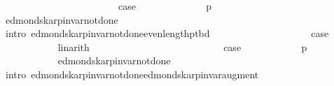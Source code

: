 \begin{isabellebody}
\isanewline
\ \ \ \ \ \ \ \ \ \ \isamarkupfalse%
\ {}\isanewline
\ \ \ \ \ \ \ \ \ \ \isamarkupfalse%
\ {\isacharquery}{\kern0pt}case\isanewline
\ \ \ \ \ \ \ \ \ \ \ \ \isamarkupfalse%
\ p\isanewline
\ \ \ \ \ \ \ \ \ \ \ \ \isamarkupfalse%
\ edmonds{\isacharunderscore}{\kern0pt}karp{\isacharunderscore}{\kern0pt}invar{\isacharunderscore}{\kern0pt}not{\isacharunderscore}{\kern0pt}done{\isacharunderscore}{\kern0pt}{}\isanewline
\ \ \ \ \ \ \ \ \ \ \ \ \isamarkupfalse%
\ {\isacharparenleft}{\kern0pt}intro\ edmonds{\isacharunderscore}{\kern0pt}karp{\isacharunderscore}{\kern0pt}invar{\isacharunderscore}{\kern0pt}not{\isacharunderscore}{\kern0pt}done{\isacharunderscore}{\kern0pt}{}{\isachardot}{\kern0pt}even{\isacharunderscore}{\kern0pt}length{\isacharunderscore}{\kern0pt}p{\isacharunderscore}{\kern0pt}tbd{\isacharparenright}{\kern0pt}\isanewline
\ \ \ \ \ \ \ \ \isamarkupfalse%
%
\endisataginvisible
{\isafoldinvisible}%
%
\isadeliminvisible
\isanewline
%
\endisadeliminvisible
%
\isadelimvisible
\ \ \ \ \ \ \ \ %
\endisadelimvisible
%
\isatagvisible
{}\isamarkupfalse%
\ \isamarkupfalse%
\ {\isacharquery}{\kern0pt}case\isanewline
\ \ \ \ \ \ \ \ \ \ \isamarkupfalse%
\ linarith\isanewline
\ \ \ \ \ \ \isamarkupfalse%
\isanewline
\ \ \ \ \ \ \ \ \isamarkupfalse%
\ {}\isanewline
\ \ \ \ \ \ \ \ \isamarkupfalse%
\ {\isacharquery}{\kern0pt}case\isanewline
\ \ \ \ \ \ \ \ \ \ \isamarkupfalse%
\ p\isanewline
\ \ \ \ \ \ \ \ \ \ \isamarkupfalse%
\ edmonds{\isacharunderscore}{\kern0pt}karp{\isacharunderscore}{\kern0pt}invar{\isacharunderscore}{\kern0pt}not{\isacharunderscore}{\kern0pt}done{\isacharunderscore}{\kern0pt}{}\isanewline
\ \ \ \ \ \ \ \ \ \ \isamarkupfalse%
\ {\isacharparenleft}{\kern0pt}intro\ edmonds{\isacharunderscore}{\kern0pt}karp{\isacharunderscore}{\kern0pt}invar{\isacharunderscore}{\kern0pt}not{\isacharunderscore}{\kern0pt}done{\isacharunderscore}{\kern0pt}{}{\isachardot}{\kern0pt}edmonds{\isacharunderscore}{\kern0pt}karp{\isacharunderscore}{\kern0pt}invar{\isacharunderscore}{\kern0pt}augment{\isacharparenright}{\kern0pt}\isanewline
\ \ \ \ \ \ \isamarkupfalse%
\isanewline
\ \ \ \ \isamarkupfalse%
\isanewline
\ \ \isamarkupfalse%
\isanewline
{}\isamarkupfalse%

\end{isabellebody}
